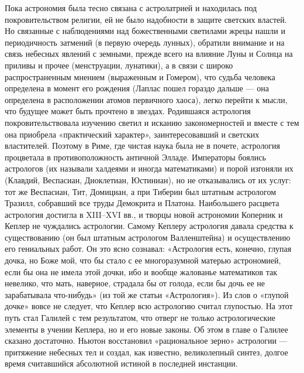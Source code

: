 Пока астрономия  была тесно  связана с  астролатрией и  находилась под
покровительством  религии, ей  не  было надобности  в защите  светских
властей. Но связанные с наблюдениями над божественными светилами жрецы
нашли  и периодичность  затмений (в  первую очередь  лунных), обратили
внимание  и на  связь  небесных  явлений с  земными,  прежде всего  на
влияние Луны и Солнца на приливы и прочее (менструации, лунатики), а в
связи с  широко распространенным  мнением (выраженным и  Гомером), что
судьба  человека  определена  в  момент  его  рождения  (Лаплас  пошел
гораздо  дальше ---  она определена  в расположении  атомов первичного
хаоса),  легко перейти  к мысли,  что  будущее может  быть прочтено  в
звездах. Родившаяся  астрология покровительствовала изучению  светил и
исканию  закономерностей и  вместе с  тем она  приобрела «практический
характер»,   заинтересовавший  и   светских  властителей.   Поэтому  в
Риме,  где  чистая  наука  была не  в  почете,  астрология  процветала
в  противоположность античной  Элладе.  Императоры боялись  астрологов
(их  называли халдеями  и  иногда математиками)  и  порой изгоняли  их
(Клавдий,  Веспасиан, Диоклетиан,  Юстиниан),  но  не отказывались  от
их  услуг:  тот  же  Веспасиан,  Тит,  Домициан,  а  при  Тиберии  был
штатным астрологом  Тразилл, собравший все труды  Демокрита и Платона.
Наибольшего  расцвета астрология  достигла в  XIII--XVI вв.,  и творцы
новой  астрономии Коперник  и Кеплер  не чуждались  астрологии. Самому
Кеплеру  астрология давала  средства к  существованию (он  был штатным
астрологом Валленштейна) и осуществлению  его гениальных работ. Он это
ясно сознавал: «Астрология  есть, конечно, глупая дочка,  но Боже мой,
что бы  стало с ее многоразумной  матерью астрономией, если бы  она не
имела этой дочки, ибо и вообще жалованье математиков так невелико, что
мать, наверное, страдала бы от голода, если бы дочь ее не зарабатывала
что-нибудь» (из той же статьи  «Астрология»). Из слов о «глупой дочке»
вовсе  не следует,  что  Кеплер всю  астрологию  считал глупостью.  На
этот  путь  стал Галилей  с  тем  результатом,  что отверг  не  только
астрологические  элементы в  учении Кеплера,  но и  его новые  законы.
Об  этом в  главе  о Галилее  сказано  достаточно. Ньютон  восстановил
«рациональное зерно» астрологии ---  притяжение небесных тел и создал,
как известно, великолепный синтез, долгое время считавшийся абсолютной
истиной в последней инстанции.

